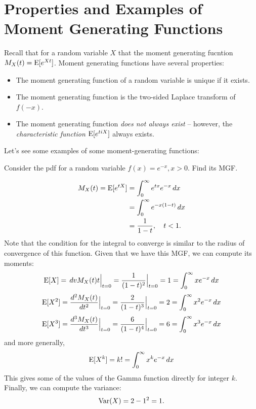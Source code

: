 \documentclass[../main.tex]{subfiles}
\begin{document}
\section{Properties and Examples of Moment Generating Functions}
Recall that for a random variable $X$ that the moment generating fucntion $M_X(t) = \mathrm E[e^{Xt}]$. Moment generating functions have several properties: 
\begin{itemize}
    \item The moment generating function of a random variable is unique if it exists. 
    \item The moment generating function is the two-sided Laplace transform of $f(-x)$. 
    \item The moment generating function \textit{does not always exist} -- however, the \textit{characteristic function} $\mathrm E[e^{tiX}]$ always exists. 
\end{itemize}
Let's see some examples of some moment-generating functions: 
\begin{example}
    Consider the pdf for a random variable $f(x) = e^{-x}, x>0$. Find its MGF. 
\end{example}
\begin{solution}
\begin{align*}
    M_X(t) = \mathrm E[e^{tX}] &= \int_0^\infty e^{tx} e^{-x} \,dx \\
    &= \int_0^\infty e^{-x(1-t)} \,dx \\
    &= \frac{1}{1-t}, \quad t < 1. 
\end{align*}
Note that the condition for the integral to converge is similar to the radius of convergence of this function. Given that we have this MGF, we can compute its moments: 
\[
    \mathrm E[X] = \,dv{M_X(t)}{t}\Big|_{t=0} = \frac{1}{(1-t)^2}\Big|_{t=0} = 1 = \int_0^\infty xe^{-x} \,dx
\]
\[
    \mathrm E[X^2] = \frac{d^2 M_X(t)}{d t^2}\Big|_{t=0} = \frac{2}{(1-t)^3}\Big|_{t=0} = 2 = \int_0^\infty x^2e^{-x} \,dx
\]
\[
    \mathrm E[X^3] = \frac{d^{3} M_X(t)}{d t^{3}}\Big|_{t=0} = \frac{6}{(1-t)^4}\Big|_{t=0} = 6 = \int_0^\infty x^3e^{-x} \,dx
\]
and more generally, 
\[
\mathrm E[X^k] = k! = \int_0^\infty x^k e^{-x} \,dx 
\]
This gives some of the values of the Gamma function directly for integer $k$. Finally, we can compute the variance: 
\[
\mathrm{Var}(X) = 2 - 1^2 = 1.
\]
\end{solution}
\end{document}
